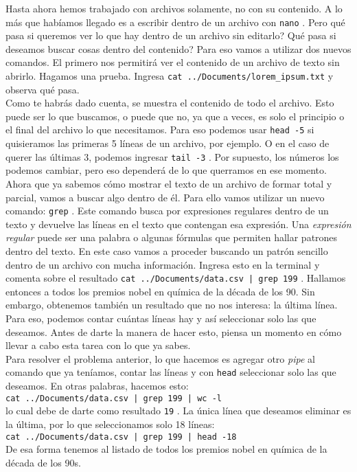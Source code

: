 \documentclass[10pt,letterpaper]{article}
\newcommand{\inlinecode}[1]{
\colorbox{light-gray}{\texttt{#1}}
}
\begin{document}
Hasta ahora hemos trabajado con archivos solamente, no con su contenido. A lo m\'as que hab\'iamos llegado es a escribir dentro de un archivo con \inlinecode{nano}. Pero qu\'e pasa si queremos ver lo que hay dentro de un archivo sin editarlo? Qu\'e pasa si deseamos buscar cosas dentro del contenido? Para eso vamos a utilizar dos nuevos comandos. El primero nos permitir\'a ver el contenido de un archivo de texto sin abrirlo. Hagamos una prueba. Ingresa \inlinecode{cat ../Documents/lorem\_ipsum.txt} y observa qu\'e pasa.\\

Como te habr\'as dado cuenta, se muestra el contenido de todo el archivo. Esto puede ser lo que buscamos, o puede que no, ya que a veces, es solo el principio o el final del archivo lo que necesitamos. Para eso podemos usar \inlinecode{head -5} si quisieramos las primeras 5 l\'ineas de un archivo, por ejemplo. O en el caso de querer las \'ultimas 3, podemos ingresar \inlinecode{tail -3}. Por supuesto, los n\'umeros los podemos cambiar, pero eso depender\'a de lo que querramos en ese momento.\\

Ahora que ya sabemos c\'omo mostrar el texto de un archivo de formar total y parcial, vamos a buscar algo dentro de \'el. Para ello vamos utilizar un nuevo comando: \inlinecode{grep}. Este comando busca por expresiones regulares dentro de un texto y devuelve las l\'ineas en el texto que contengan esa expresi\'on. Una \emph{expresi\'on regular} puede ser una palabra o algunas f\'ormulas que permiten hallar patrones dentro del texto. En este caso vamos a proceder buscando un patr\'on sencillo dentro de un archivo con mucha informaci\'on. Ingresa esto en la terminal y comenta sobre el resultado \inlinecode{cat ../Documents/data.csv | grep 199}. Hallamos entonces a todos los premios nobel en qu\'imica de la d\'ecada de los 90. Sin embargo, obtenemos tambi\'en un resultado que no nos interesa: la \'ultima l\'inea. Para eso, podemos contar cu\'antas l\'ineas hay y as\'i seleccionar solo las que deseamos. Antes de darte la manera de hacer esto, piensa un momento en c\'omo llevar a cabo esta tarea con lo que ya sabes.\\

Para resolver el problema anterior, lo que hacemos es agregar otro \emph{pipe} al comando que ya ten\'iamos, contar las l\'ineas y con \inlinecode{head} seleccionar solo las que deseamos. En otras palabras, hacemos esto:\\
\inlinecode{cat ../Documents/data.csv | grep 199 | wc -l}\\
lo cual debe de darte como resultado \inlinecode{19}. La \'unica l\'inea que deseamos eliminar es la \'ultima, por lo que seleccionamos solo 18 l\'ineas:\\
\inlinecode{cat ../Documents/data.csv | grep 199 | head -18}\\
De esa forma tenemos al listado de todos los premios nobel en qu\'imica de la d\'ecada de los 90s.
\end{document}
